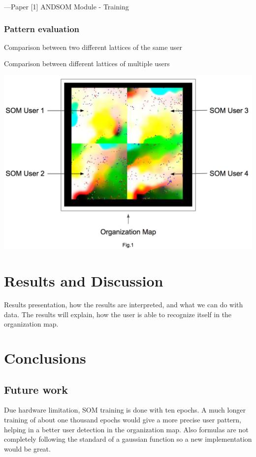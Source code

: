 \documentclass{article}
\begin{document}
---{Paper [1] ANDSOM Module - Training}






\subsubsection{Pattern evaluation} %
Comparison between two different lattices of the same user

Comparison between different lattices of multiple users

	\begin{center}\includegraphics[scale=0.5]{fig-one} \end{center}






\section{Results and Discussion} %
Results presentation, how the results are interpreted, and what we can do with data.
The results will explain, how the user is able to recognize itself in the organization map.






\section{Conclusions} %

\subsection{Future work} %
Due hardware limitation, SOM training is done with ten epochs. A much longer training of about one thousand epochs would give a more precise user pattern, helping in a better user detection in the organization map.
Also formulas are not completely following the standard of a gaussian function so a new implementation would be great.
\end{document}
